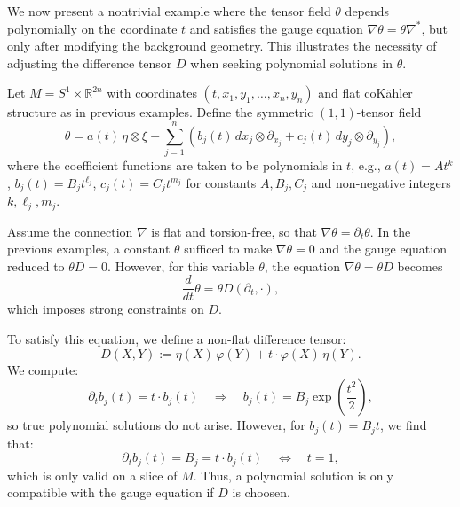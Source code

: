 \begin{ex}

We now present a nontrivial example where the tensor field $\theta$ depends polynomially on the coordinate $t$ and satisfies the gauge equation $\nabla \theta = \theta \nabla^*$, but only after modifying the background geometry. This illustrates the necessity of adjusting the difference tensor $D$ when seeking polynomial solutions in $\theta$.

Let $M = S^1 \times \mathbb{R}^{2n}$ with coordinates $(t, x_1, y_1, \ldots, x_n, y_n)$ and flat coKähler structure as in previous examples. Define the symmetric $(1,1)$-tensor field
\[
\theta = a(t)\, \eta \otimes \xi + \sum_{j=1}^n \left( b_j(t)\, dx_j \otimes \partial_{x_j} + c_j(t)\, dy_j \otimes \partial_{y_j} \right),
\]
where the coefficient functions are taken to be polynomials in $t$, e.g., $a(t) = A t^k$, $b_j(t) = B_j t^{\ell_j}$, $c_j(t) = C_j t^{m_j}$ for constants $A, B_j, C_j$ and non-negative integers $k, \ell_j, m_j$.

Assume the connection $\nabla$ is flat and torsion-free, so that $\nabla \theta = \partial_t \theta$. In the previous examples, a constant $\theta$ sufficed to make $\nabla \theta = 0$ and the gauge equation reduced to $\theta D = 0$. However, for this variable $\theta$, the equation $\nabla \theta = \theta D$ becomes
\[
\frac{d}{dt} \theta = \theta D(\partial_t, \cdot),
\]
which imposes strong constraints on $D$.

To satisfy this equation, we define a non-flat difference tensor:
\[
D(X,Y) := \eta(X)\, \varphi(Y) + t \cdot \varphi(X)\, \eta(Y).
\]
We compute:
\[
\partial_t b_j(t) = t \cdot b_j(t) \quad \Rightarrow \quad b_j(t) = B_j \exp\left(\frac{t^2}{2}\right),
\]
so true polynomial solutions do not arise. However, for $b_j(t) = B_j t$, we find that:
\[
\partial_t b_j(t) = B_j = t \cdot b_j(t) \quad \Leftrightarrow \quad t = 1,
\]
which is only valid on a slice of $M$. Thus, a  polynomial solution is only compatible with the gauge equation if $D$ is choosen. 
\end{ex}

